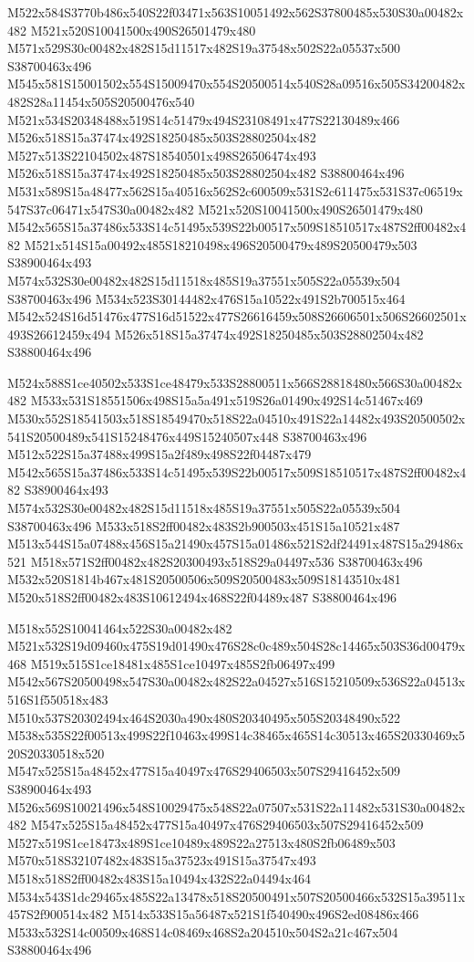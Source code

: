 \documentclass{article}
\begin{document}
\begin{multicols}{2}
M522x584S3770b486x540S22f03471x563S10051492x562S37800485x530S30a00482x482 M521x520S10041500x490S26501479x480 M571x529S30c00482x482S15d11517x482S19a37548x502S22a05537x500 S38700463x496 M545x581S15001502x554S15009470x554S20500514x540S28a09516x505S34200482x482S28a11454x505S20500476x540 M521x534S20348488x519S14c51479x494S23108491x477S22130489x466 M526x518S15a37474x492S18250485x503S28802504x482 M527x513S22104502x487S18540501x498S26506474x493 M526x518S15a37474x492S18250485x503S28802504x482 S38800464x496 M531x589S15a48477x562S15a40516x562S2c600509x531S2c611475x531S37c06519x547S37c06471x547S30a00482x482 M521x520S10041500x490S26501479x480 M542x565S15a37486x533S14c51495x539S22b00517x509S18510517x487S2ff00482x482 M521x514S15a00492x485S18210498x496S20500479x489S20500479x503 S38900464x493 M574x532S30e00482x482S15d11518x485S19a37551x505S22a05539x504 S38700463x496 M534x523S30144482x476S15a10522x491S2b700515x464 M542x524S16d51476x477S16d51522x477S26616459x508S26606501x506S26602501x493S26612459x494 M526x518S15a37474x492S18250485x503S28802504x482 S38800464x496

M524x588S1ce40502x533S1ce48479x533S28800511x566S28818480x566S30a00482x482 M533x531S18551506x498S15a5a491x519S26a01490x492S14c51467x469 M530x552S18541503x518S18549470x518S22a04510x491S22a14482x493S20500502x541S20500489x541S15248476x449S15240507x448 S38700463x496 M512x522S15a37488x499S15a2f489x498S22f04487x479 M542x565S15a37486x533S14c51495x539S22b00517x509S18510517x487S2ff00482x482 S38900464x493 M574x532S30e00482x482S15d11518x485S19a37551x505S22a05539x504 S38700463x496 M533x518S2ff00482x483S2b900503x451S15a10521x487 M513x544S15a07488x456S15a21490x457S15a01486x521S2df24491x487S15a29486x521 M518x571S2ff00482x482S20300493x518S29a04497x536 S38700463x496 M532x520S1814b467x481S20500506x509S20500483x509S18143510x481 M520x518S2ff00482x483S10612494x468S22f04489x487 S38800464x496

M518x552S10041464x522S30a00482x482 M521x532S19d09460x475S19d01490x476S28c0c489x504S28c14465x503S36d00479x468 M519x515S1ce18481x485S1ce10497x485S2fb06497x499 M542x567S20500498x547S30a00482x482S22a04527x516S15210509x536S22a04513x516S1f550518x483 M510x537S20302494x464S2030a490x480S20340495x505S20348490x522 M538x535S22f00513x499S22f10463x499S14c38465x465S14c30513x465S20330469x520S20330518x520 M547x525S15a48452x477S15a40497x476S29406503x507S29416452x509 S38900464x493 M526x569S10021496x548S10029475x548S22a07507x531S22a11482x531S30a00482x482 M547x525S15a48452x477S15a40497x476S29406503x507S29416452x509 M527x519S1ce18473x489S1ce10489x489S22a27513x480S2fb06489x503 M570x518S32107482x483S15a37523x491S15a37547x493 M518x518S2ff00482x483S15a10494x432S22a04494x464 M534x543S1dc29465x485S22a13478x518S20500491x507S20500466x532S15a39511x457S2f900514x482 M514x533S15a56487x521S1f540490x496S2ed08486x466 M533x532S14c00509x468S14c08469x468S2a204510x504S2a21c467x504 S38800464x496


\end{multicols}
\end{document}

